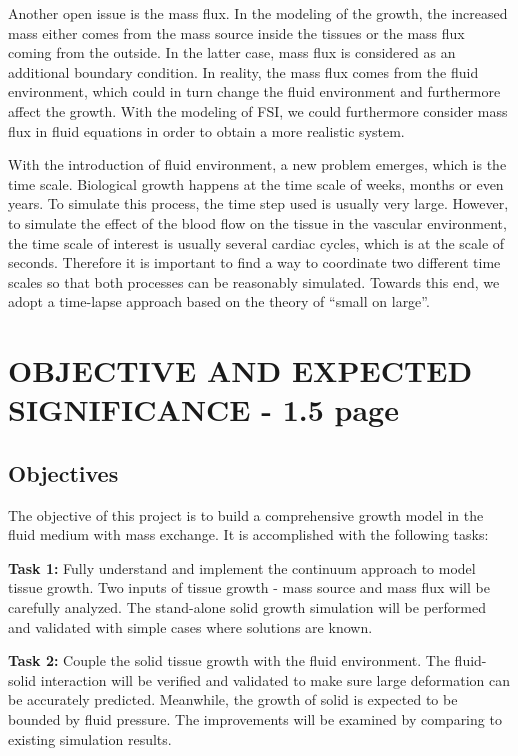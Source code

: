 \documentclass[12pt]{article}
\begin{document}
Another open issue is the mass flux. In the modeling of the growth, the increased mass either comes from the mass source inside the tissues or the mass flux coming from the outside. In the latter case, mass flux is considered as an additional boundary condition. In reality, the mass flux comes from the fluid environment, which could in turn change the fluid environment and furthermore affect the growth. With the modeling of FSI, we could furthermore consider mass flux in fluid equations in order to obtain a more realistic system.

With the introduction of fluid environment, a new problem emerges, which is the time scale. Biological growth happens at the time scale of weeks, months or even years. To simulate this process, the time step used is usually very large. However, to simulate the effect of the blood flow on the tissue in the vascular environment, the time scale of interest is usually several cardiac cycles, which is at the scale of seconds. Therefore it is important to find a way to coordinate two different time scales so that both processes can be reasonably simulated. Towards this end, we adopt a time-lapse approach based on the theory of ``small on large''.

\section{OBJECTIVE AND EXPECTED SIGNIFICANCE - 1.5 page}

\subsection{Objectives}
The objective of this project is to build a comprehensive growth model in the fluid medium with mass exchange. It is accomplished with the following tasks:

\textbf{Task 1:} Fully understand and implement the continuum approach to model tissue growth. Two inputs of tissue growth - mass source and mass flux will be carefully analyzed. The stand-alone solid growth simulation will be performed and validated with simple cases where solutions are known.

\textbf{Task 2:} Couple the solid tissue growth with the fluid environment. The fluid-solid interaction will be verified and validated to make sure large deformation can be accurately predicted. Meanwhile, the growth of solid is expected to be bounded by fluid pressure. The improvements will be examined by comparing to existing simulation results.
 
\end{document}
